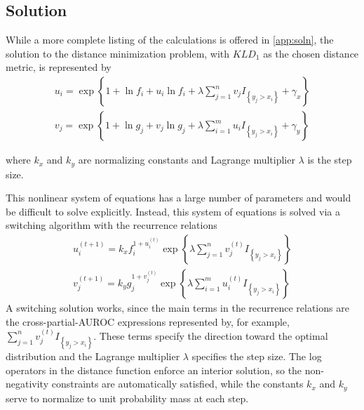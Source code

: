 


\subsection{Solution}

While a more complete listing of the calculations is offered in \ref{app:soln}, the solution to the distance minimization problem, with $KLD_1$ as the chosen distance metric, is represented by
%
\begin{align}
    u_i = \exp{ \left\{ 1 + \ln f_i + u_i \ln f_i
        + \lambda \sum_{j = 1}^{n} v_j I_{\left\{ y_j > x_i \right\}} + \gamma_x \right\} } \\
    v_j = \exp{ \left\{ 1 + \ln g_j + v_j \ln g_j
        + \lambda \sum_{i = 1}^{m} u_i I_{\left\{ y_j > x_i \right\}} + \gamma_y \right\} }
\end{align}

\noindent where $k_x$ and $k_y$ are normalizing constants and Lagrange multiplier $\lambda$ is the step size.

%
This nonlinear system of equations has a large number of parameters and would be difficult to solve explicitly.
%
Instead, this system of equations is solved via a switching algorithm with the recurrence relations
%
\begin{align}
%
    u_i^{(t+1)} = k_x f_i ^{1 + u_i^{(t)}}
            \exp{ \left\{ \lambda \sum_{j = 1}^{n} v_j^{(t)} I_{\left\{ y_j > x_i \right\}} \right\} } \\
%
    v_j^{(t+1)} = k_y g_j ^{1 + v_j^{(t)}}
            \exp{ \left\{ \lambda \sum_{i = 1}^{m} u_i^{(t)} I_{\left\{ y_j > x_i \right\}}  \right\} }
%
\end{align}
%
\noindent A switching solution works, since the main terms in the recurrence relations are the cross-partial-AUROC expressions represented by, for example, $\sum_{j = 1}^{n} v_j^{(t)} I_{\left\{ y_j > x_i \right\}}$.
%
These terms specify the direction toward the optimal distribution and the Lagrange multiplier $\lambda$ specifies the step size.
The log operators in the distance function enforce an interior solution, so the non-negativity constraints are automatically satisfied, while the constants $k_x$ and $k_y$ serve to normalize to unit probability mass at each step.

